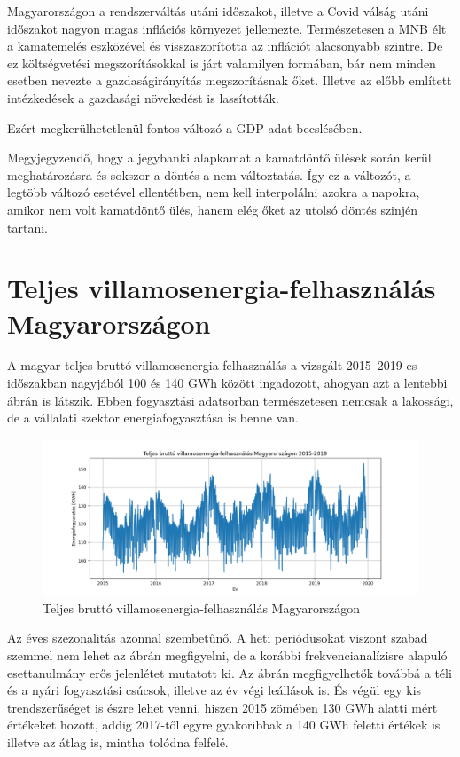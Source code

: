 Magyarországon a rendszerváltás utáni időszakot, illetve a Covid válság utáni időszakot nagyon
magas inflációs környezet jellemezte. Természetesen a MNB élt a kamatemelés eszközével és
visszaszorította az inflációt alacsonyabb szintre. De ez költségvetési megszorításokkal is járt
valamilyen formában, bár nem minden esetben nevezte a gazdaságirányítás megszorításnak őket.
Illetve az előbb említett intézkedések a gazdasági növekedést is lassították.

Ezért megkerülhetetlenül fontos változó a GDP adat becslésében.

Megyjegyzendő, hogy a jegybanki alapkamat a kamatdöntő ülések során kerül meghatározásra és sokszor
a döntés a nem változtatás. Így ez a változót, a legtöbb változó esetével ellentétben, nem kell
interpolálni azokra a napokra, amikor nem volt kamatdöntő ülés, hanem elég őket az utolsó döntés
szinjén tartani.

\section{Teljes villamosenergia-felhasználás Magyarországon}

A magyar teljes bruttó villamosenergia-felhasználás a vizsgált 2015--2019-es időszakban nagyjából
100 és 140 GWh között ingadozott, ahogyan azt a lentebbi ábrán is látszik. Ebben fogyasztási
adatsorban természetesen nemcsak a lakossági, de a vállalati szektor energiafogyasztása is benne
van.

\begin{figure}[htbp]
    \centering
    \includegraphics[width=1\textwidth, height=0.8\textheight, keepaspectratio]{../figures/mavir.png}
    \caption{Teljes bruttó villamosenergia-felhasználás Magyarországon}\label{fig:mavir}
\end{figure}

Az éves szezonalitás azonnal szembetűnő. A heti periódusokat viszont szabad szemmel nem lehet az
ábrán megfigyelni, de a korábbi frekvencianalízisre alapuló esettanulmány erős jelenlétet mutatott
ki. Az ábrán megfigyelhetők továbbá a téli és a nyári fogyasztási csúcsok, illetve az év végi
leállások is. És végül egy kis trendszerűséget is észre lehet venni, hiszen 2015 zömében 130 GWh
alatti mért értékeket hozott, addig 2017-től egyre gyakoribbak a 140 GWh feletti értékek is illetve
az átlag is, mintha tolódna felfelé.

